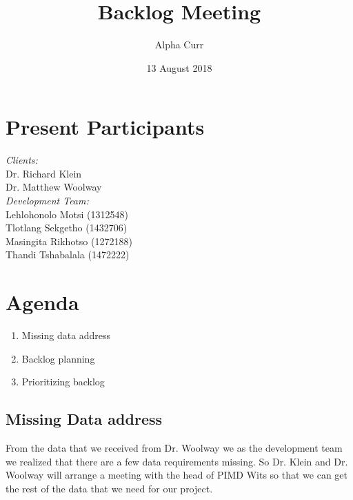 \documentclass[11pt]{article}
\title{Backlog Meeting}
\author{Alpha Curr}
\date{13 August 2018}
\begin{document}
\maketitle

\section{Present Participants}
\textit{Clients:}\\
Dr. Richard Klein\\
Dr. Matthew Woolway\\
\newline
\textit{Development Team:}\\
Lehlohonolo Motsi (1312548)\\
Tlotlang Sekgetho (1432706)\\
Masingita Rikhotso (1272188)\\
Thandi Tshabalala (1472222)\\

\section{Agenda}
\begin{enumerate}
\item Missing data address
\item Backlog planning
\item Prioritizing backlog
\end{enumerate}

\subsection{Missing Data address}
From the data that we received from Dr. Woolway we as the development team we realized that there are a few data requirements missing. So Dr. Klein and Dr. Woolway will arrange a meeting with the head of PIMD Wits so that we can get the rest of the data that we need for our project.\\
\end{document}
